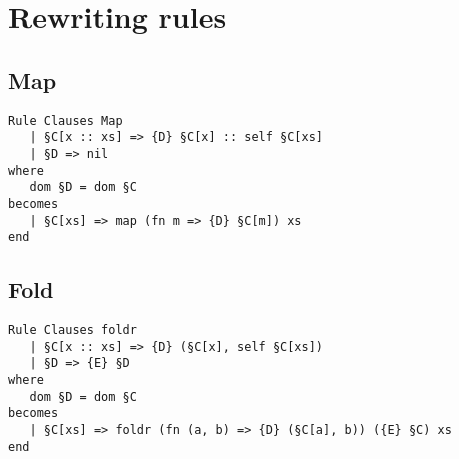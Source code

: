 \chapter{Rewriting rules}

\section{Map}


\begin{verbatim}
Rule Clauses Map
   | §C[x :: xs] => {D} §C[x] :: self §C[xs]
   | §D => nil
where
   dom §D = dom §C
becomes
   | §C[xs] => map (fn m => {D} §C[m]) xs
end
\end{verbatim}


\section{Fold}

\begin{verbatim}
Rule Clauses foldr
   | §C[x :: xs] => {D} (§C[x], self §C[xs])
   | §D => {E} §D
where
   dom §D = dom §C
becomes
   | §C[xs] => foldr (fn (a, b) => {D} (§C[a], b)) ({E} §C) xs
end
\end{verbatim}

